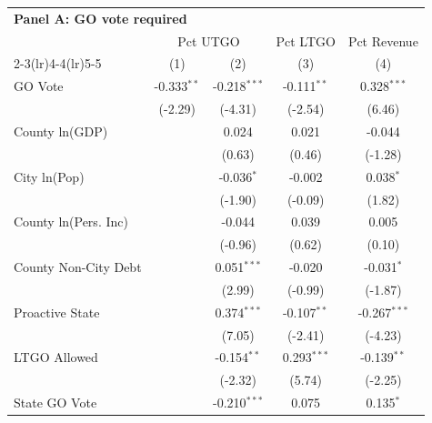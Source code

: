 \begingroup
\centering
\begin{tabular*}{\textwidth}{@{\extracolsep{\fill}}lcccc}
\multicolumn{5}{l}{\textbf{Panel A: GO vote required}}\\

\addlinespace
   \toprule
    & \multicolumn{2}{c}{Pct UTGO} & Pct LTGO & Pct Revenue\\
   \cmidrule(lr){2-3}\cmidrule(lr){4-4}\cmidrule(lr){5-5}
                               & (1)           & (2)            & (3)           & (4)\\  
   \midrule 
   GO Vote                     & -0.333$^{**}$ & -0.218$^{***}$ & -0.111$^{**}$ & 0.328$^{***}$\\   
                               & (-2.29)      & (-4.31)       & (-2.54)      & (6.46)\\   
   County ln(GDP)              &               & 0.024          & 0.021         & -0.044\\   
                               &               & (0.63)        & (0.46)       & (-1.28)\\   
   City ln(Pop)                &               & -0.036$^{*}$   & -0.002        & 0.038$^{*}$\\   
                               &               & (-1.90)       & (-0.09)      & (1.82)\\   
   County ln(Pers. Inc)        &               & -0.044         & 0.039         & 0.005\\   
                               &               & (-0.96)       & (0.62)       & (0.10)\\   
   County Non-City Debt        &               & 0.051$^{***}$  & -0.020        & -0.031$^{*}$\\   
                               &               & (2.99)        & (-0.99)      & (-1.87)\\   
   Proactive State             &               & 0.374$^{***}$  & -0.107$^{**}$ & -0.267$^{***}$\\   
                               &               & (7.05)        & (-2.41)      & (-4.23)\\   
   LTGO Allowed                &               & -0.154$^{**}$  & 0.293$^{***}$ & -0.139$^{**}$\\   
                               &               & (-2.32)       & (5.74)       & (-2.25)\\   
   State GO Vote               &               & -0.210$^{***}$ & 0.075         & 0.135$^{*}$\\   

\end{tabular*}
